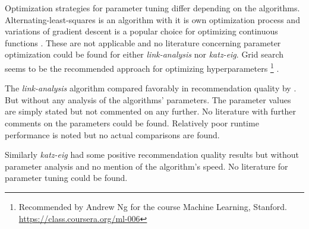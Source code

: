 
Optimization strategies for parameter tuning differ depending on the algorithms. Alternating-least-squares is an algorithm with it is own optimization process and variations of gradient descent is a popular choice for optimizing continuous functions \citep{hu2008collaborative}. These are not applicable and no literature concerning parameter optimization could be found for either \textit{link-analysis} nor \textit{katz-eig}.  Grid search seems to be the recommended approach for optimizing hyperparameters
\footnote{Recommended by Andrew Ng for the course Machine Learning, Stanford. \url{https://class.coursera.org/ml-006}}
.

The \textit{link-analysis} algorithm compared favorably in recommendation quality by \citep{huang2007comparison}. But without any analysis of the algorithms' parameters. The parameter values are simply stated but not commented on any further. No literature with further comments on the parameters could be found. Relatively poor runtime performance is noted \citep{huang2004link} but no actual comparisons are found.

Similarly \textit{katz-eig} had some positive recommendation quality results \citep{shin2012multi} but without parameter analysis and no mention of the algorithm's speed. No literature for parameter tuning could be found.

